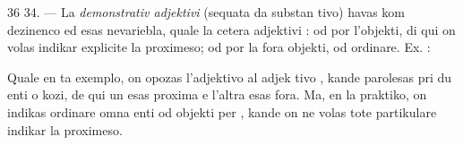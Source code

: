 \begin{VUpage}[40]{36}
34. --- La \textit{demonstrativ adjektivi} (sequata da substan\cc
tivo) havas  kom dezinenco ed esas nevariebla, quale la\nl
cetera adjektivi :  od  por l'objekti, di qui on volas\nl
indikar explicite la proximeso;  od  por la fora objekti,\nl
od ordinare. Ex. : \nl
{}

Quale en ta exemplo, on opozas l'adjektivo  al adjek\cc
tivo , kande parolesas pri du enti o kozi, de qui un esas\nl
proxima e l'altra esas fora. Ma, en la praktiko, on indikas\nl
ordinare omna enti od objekti per , kande on ne volas\nl
tote partikulare indikar la proximeso.
\end{VUpage}

